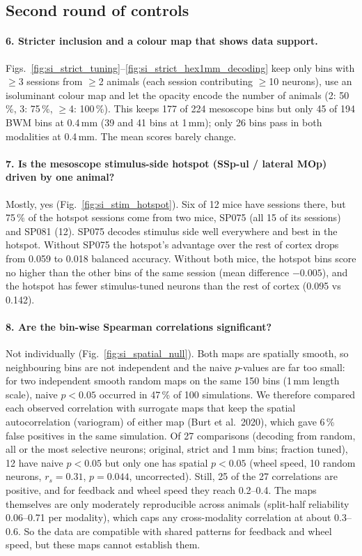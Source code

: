 \documentclass[10pt]{article}
\begin{document}
\subsection*{Second round of controls}
\label{sec:controls2}
\paragraph{6. Stricter inclusion and a colour map that shows data support.}
Figs.~\ref{fig:si_strict_tuning}--\ref{fig:si_strict_hex1mm_decoding} keep only bins with $\geq$3 sessions from $\geq$2 animals (each session contributing $\geq$10 neurons), use an isoluminant colour map and let the opacity encode the number of animals (2: 50\,\%, 3: 75\,\%, $\geq$4: 100\,\%). This keeps 177 of 224 mesoscope bins but only 45 of 194 BWM bins at 0.4\,mm (39 and 41 bins at 1\,mm); only 26 bins pass in both modalities at 0.4\,mm. The mean scores barely change.

\paragraph{7. Is the mesoscope stimulus-side hotspot (SSp-ul / lateral MOp) driven by one animal?}
Mostly, yes (Fig.~\ref{fig:si_stim_hotspot}). Six of 12 mice have sessions there, but 75\,\% of the hotspot sessions come from two mice, SP075 (all 15 of its sessions) and SP081 (12). SP075 decodes stimulus side well everywhere and best in the hotspot. Without SP075 the hotspot's advantage over the rest of cortex drops from 0.059 to 0.018 balanced accuracy. Without both mice, the hotspot bins score no higher than the other bins of the same session (mean difference $-0.005$), and the hotspot has fewer stimulus-tuned neurons than the rest of cortex (0.095 vs 0.142).

\paragraph{8. Are the bin-wise Spearman correlations significant?}
Not individually (Fig.~\ref{fig:si_spatial_null}). Both maps are spatially smooth, so neighbouring bins are not independent and the naive $p$-values are far too small: for two independent smooth random maps on the same 150 bins (1\,mm length scale), naive $p<0.05$ occurred in 47\,\% of 100 simulations. We therefore compared each observed correlation with surrogate maps that keep the spatial autocorrelation (variogram) of either map (Burt et al.\ 2020), which gave 6\,\% false positives in the same simulation. Of 27 comparisons (decoding from random, all or the most selective neurons; original, strict and 1\,mm bins; fraction tuned), 12 have naive $p<0.05$ but only one has spatial $p<0.05$ (wheel speed, 10 random neurons, $r_s=0.31$, $p=0.044$, uncorrected). Still, 25 of the 27 correlations are positive, and for feedback and wheel speed they reach 0.2--0.4. The maps themselves are only moderately reproducible across animals (split-half reliability 0.06--0.71 per modality), which caps any cross-modality correlation at about 0.3--0.6. So the data are compatible with shared patterns for feedback and wheel speed, but these maps cannot establish them.
\end{document}
